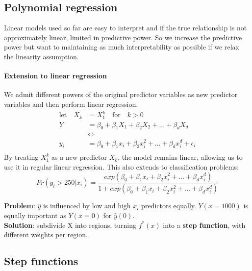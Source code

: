 \documentclass[../document.tex]{subfiles}
\begin{document}
	\subsection{Polynomial regression}
	Linear models used so far are easy to interpret and if the true relationship is not approximately linear, limited in predictive power. So we increase the predictive power but want to maintaining as much interpretability as possible if we relax the linearity assumption.

	\paragraph{Extension to linear regression}
	We admit different powers of the original predictor variables as new predictor variables and then perform linear regression.
	\begin{equation}
	\begin{split}
		\text{let} \quad X_{k} &= X^{k}_1 \quad \text{for} \quad k>0\\
		Y &= \beta_{0} + \beta_{1}X_{1} + \beta_{2}X_{2} + \dots + \beta_{d}X_{d}\\
		&\Leftrightarrow  \\
		y_{i} &= \beta_{0}+\beta_{1}x_{i}+\beta_{2}x_{i}^2 + \dots + \beta_{d}x_{i}^d+\epsilon_{i} \\
	\end{split}
	\end{equation}
	By treating $X_1^k$ as a new predictor $X_k$, the model remains linear, allowing us to use it in regular linear regression.
	This also extends to classification problems:
	\begin{equation}
		Pr(y_{i}>250|x_{i})=\frac{exp(\beta_{0}+\beta_{1}x_{i}+\beta_{2}x_{i}^2+...+\beta_{d}x_{i}^d)}{1+exp(\beta_{0}+\beta_{1}x_{i}+\beta_{2}x_{i}^2+...+\beta_{d}x_{i}^d)}
	\end{equation}

	\textbf{Problem}: $\hat{y}$ is influenced by low and high $x_i$ predictors equally. $Y(x=1000)$ is equally important as $Y(x=0)$ for $\hat{y}(0)$. \\
	\textbf{Solution}: subdivide X into regions, turning $f^{*}(x)$ into a \textbf{step function}, with different weights per region.

	\subsection{Step functions}
\end{document}

